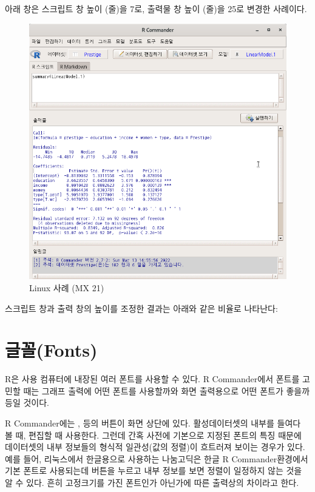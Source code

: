 \documentclass[
]{book}
\begin{document}
아래 창은 스크립트 창 높이 (줄)을 7로, 출력물 창 높이 (줄)을 25로 변경한 사례이다.

\begin{figure}
\centering
\includegraphics{fig/tools-options-03.png}
\caption{Linux 사례 (MX 21)}
\end{figure}

스크립트 창과 출력 창의 높이를 조정한 결과는 아래와 같은 비율로 나타난다:

\hypertarget{uxae00uxaf34fonts}{%
\section{글꼴(Fonts)}\label{uxae00uxaf34fonts}}

R은 사용 컴퓨터에 내장된 여러 폰트를 사용할 수 있다. R Commander에서 폰트를 고민할 때는 그래프 출력에 어떤 폰트를 사용할까와 화면 출력용으로 어떤 폰트가 좋을까 등일 것이다.

R Commander에는 , 등의 버튼이 화면 상단에 있다. 활성데이터셋의 내부를 들여다 볼 때, 편집할 때 사용한다. 그런데 간혹 사전에 기본으로 지정된 폰트의 특징 때문에 데이터셋의 내부 정보들의 형식적 일관성(값의 정렬)이 흐트러져 보이는 경우가 있다. 예를 들어, 리눅스에서 한글용으로 사용하는 나눔고딕은 한글 R Commander환경에서 기본 폰트로 사용되는데 버튼을 누르고 내부 정보를 보면 정렬이 일정하지 않는 것을 알 수 있다. 흔히 고정크기를 가진 폰트인가 아닌가에 따른 출력상의 차이라고 한다.
\end{document}
